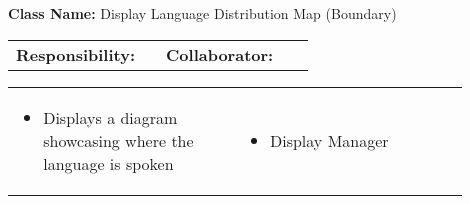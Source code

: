 \begin{cards}[]
    \textbf{Class Name:} Display Language Distribution Map (Boundary)
    \tcbline
    \begin{tabular}{p{0.45\linewidth} | p{0.45\linewidth}}
        \textbf{Responsibility:}& 
        \textbf{Collaborator:}\\
    \end{tabular}
    \tcbline
    \begin{tabular}{p{0.45\linewidth} | p{0.45\linewidth}}
        \begin{itemize}
            \item Displays a diagram showcasing where the language is spoken
        \end{itemize}
        &
        \begin{itemize}
            \item Display Manager
        \end{itemize}
    \end{tabular}
\end{cards}